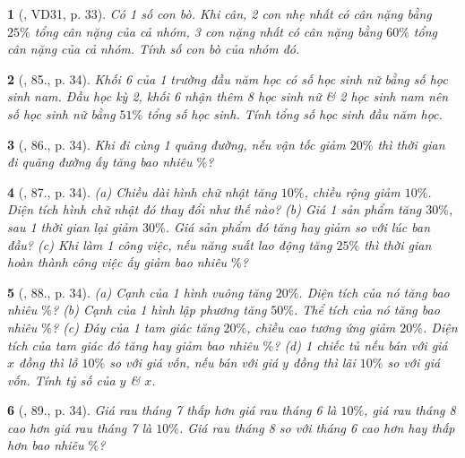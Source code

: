\documentclass{article}
\newtheorem{baitoan}{}
\begin{document}
\begin{baitoan}[\cite{Binh_Toan_6_tap_2}, VD31, p. 33]
	Có 1 số con bò. Khi cân, 2 con nhẹ nhất có cân nặng bằng $25\%$ tổng cân nặng của cả nhóm, 3 con nặng nhất có cân nặng bằng $60\%$ tổng cân nặng của cả nhóm. Tính số con bò của nhóm đó.
\end{baitoan}

\begin{baitoan}[\cite{Binh_Toan_6_tap_2}, 85., p. 34]
	Khối 6 của 1 trường đầu năm học có số học sinh nữ bằng số học sinh nam. Đầu học kỳ 2, khối 6 nhận thêm 8 học sinh nữ \& 2 học sinh nam nên số học sinh nữ bằng $51\%$ tổng số học sinh. Tính tổng số học sinh đầu năm học.
\end{baitoan}

\begin{baitoan}[\cite{Binh_Toan_6_tap_2}, 86., p. 34]
	Khi đi cùng 1 quãng đường, nếu vận tốc giảm $20\%$ thì thời gian đi quãng đường ấy tăng bao nhiêu $\%$?
\end{baitoan}

\begin{baitoan}[\cite{Binh_Toan_6_tap_2}, 87., p. 34]
	(a) Chiều dài hình chữ nhật tăng $10\%$, chiều rộng giảm $10\%$. Diện tích hình chữ nhật đó thay đổi như thế nào? (b) Giá 1 sản phẩm tăng $30\%$, sau 1 thời gian lại giảm $30\%$. Giá sản phẩm đó tăng hay giảm so với lúc ban đầu? (c) Khi làm 1 công việc, nếu năng suất lao động tăng $25\%$ thì thời gian hoàn thành công việc ấy giảm bao nhiêu $\%$?
\end{baitoan}

\begin{baitoan}[\cite{Binh_Toan_6_tap_2}, 88., p. 34]
	(a) Cạnh của 1 hình vuông tăng $20\%$. Diện tích của nó tăng bao nhiêu $\%$? (b) Cạnh của 1 hình lập phương tăng $50\%$. Thể tích của nó tăng bao nhiêu $\%$? (c) Đáy của 1 tam giác tăng $20\%$, chiều cao tương ứng giảm $20\%$. Diện tích của tam giác đó tăng hay giảm bao nhiêu $\%$? (d) 1 chiếc tủ nếu bán với giá $x$ đồng thì lỗ $10\%$ so với giá vốn, nếu bán với giá $y$ đồng thì lãi $10\%$ so với giá vốn. Tính tỷ số của $y$ \& $x$.
\end{baitoan}

\begin{baitoan}[\cite{Binh_Toan_6_tap_2}, 89., p. 34]
	Giá rau tháng 7 thấp hơn giá rau tháng 6 là $10\%$, giá rau tháng 8 cao hơn giá rau tháng 7 là $10\%$. Giá rau tháng 8 so với tháng 6 cao hơn hay thấp hơn bao nhiêu $\%$?
\end{baitoan}
\end{document}

